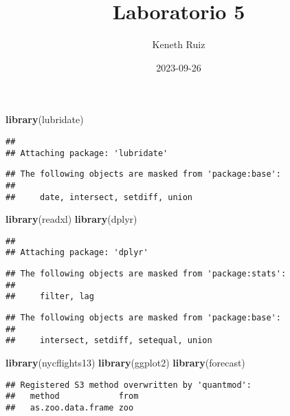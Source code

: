 \documentclass[
]{article}
\title{Laboratorio 5}
\author{Keneth Ruiz}
\date{2023-09-26}
\newenvironment{Shaded}{\begin{snugshade}}{\end{snugshade}}
\newcommand{\FunctionTok}[1]{\textcolor[rgb]{0.13,0.29,0.53}{\textbf{#1}}}
\newcommand{\NormalTok}[1]{#1}
\begin{document}
\maketitle

\begin{Shaded}
\begin{Highlighting}[]
\FunctionTok{library}\NormalTok{(lubridate)}
\end{Highlighting}
\end{Shaded}

\begin{verbatim}
## 
## Attaching package: 'lubridate'
\end{verbatim}

\begin{verbatim}
## The following objects are masked from 'package:base':
## 
##     date, intersect, setdiff, union
\end{verbatim}

\begin{Shaded}
\begin{Highlighting}[]
\FunctionTok{library}\NormalTok{(readxl)}
\FunctionTok{library}\NormalTok{(dplyr)}
\end{Highlighting}
\end{Shaded}

\begin{verbatim}
## 
## Attaching package: 'dplyr'
\end{verbatim}

\begin{verbatim}
## The following objects are masked from 'package:stats':
## 
##     filter, lag
\end{verbatim}

\begin{verbatim}
## The following objects are masked from 'package:base':
## 
##     intersect, setdiff, setequal, union
\end{verbatim}

\begin{Shaded}
\begin{Highlighting}[]
\FunctionTok{library}\NormalTok{(nycflights13)}
\FunctionTok{library}\NormalTok{(ggplot2)}
\FunctionTok{library}\NormalTok{(forecast)}
\end{Highlighting}
\end{Shaded}

\begin{verbatim}
## Registered S3 method overwritten by 'quantmod':
##   method            from
##   as.zoo.data.frame zoo
\end{verbatim}
\end{document}
